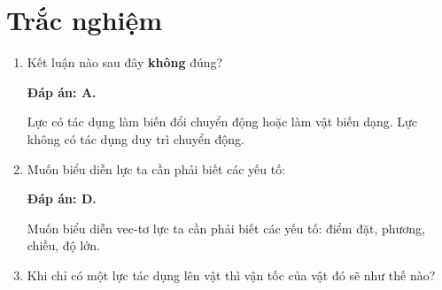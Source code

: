 \whiteBGstarBegin
\setcounter{section}{0}
\section{Trắc nghiệm}
\begin{enumerate}[label=\bfseries Câu \arabic*:]
	\item {}
	
	\cauhoi
	{Kết luận nào sau đây \textbf{không} đúng?
	}
	
	\loigiai
	{		\textbf{Đáp án: A.}
		
		Lực có tác dụng làm biến đổi chuyển động hoặc làm vật biến dạng. Lực không có tác dụng duy trì chuyển động.
		
	}
	\item {}
	
	\cauhoi
	{Muốn biểu diễn lực ta cần phải biết các yếu tố:
	}
	
	\loigiai
	{		\textbf{Đáp án: D.}
		
		Muốn biểu diễn vec-tơ lực ta cần phải biết các yếu tố: điểm đặt, phương, chiều, độ lớn.
		
	}
	\item {}
	
	\cauhoi
	{Khi chỉ có một lực tác dụng lên vật thì vận tốc của vật đó sẽ như thế nào?
	}
	

\end{enumerate}
